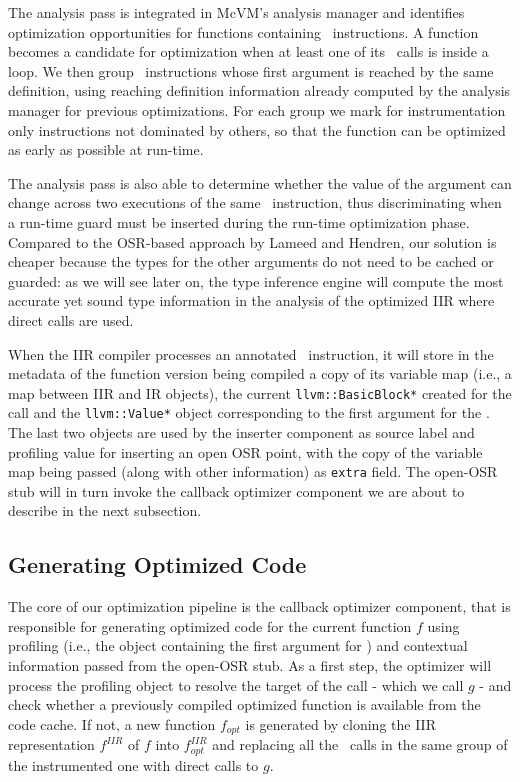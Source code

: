 The analysis pass is integrated in McVM's analysis manager and identifies optimization opportunities for functions containing \feval\ instructions. A function becomes a candidate for optimization when at least one of its \feval\ calls is inside a loop. We then group \feval\ instructions whose first argument is reached by the same definition, using reaching definition information already computed by the analysis manager for previous optimizations. For each group we mark for instrumentation only instructions not dominated by others, so that the function can be optimized as early as possible at run-time.

The analysis pass is also able to determine whether the value of the argument can change across two executions of the same \feval\ instruction, thus discriminating when a run-time guard must be inserted during the run-time optimization phase. Compared to the OSR-based approach by Lameed and Hendren, our solution is cheaper because the types for the other arguments do not need to be cached or guarded: as we will see later on, the type inference engine will compute the most accurate yet sound type information in the analysis of the optimized IIR where direct calls are used.

When the IIR compiler processes an annotated \feval\ instruction, it will store in the metadata of the function version being compiled a copy of its variable map (i.e., a map between IIR and IR objects), the current {\tt llvm::BasicBlock*} created for the call and the {\tt llvm::Value*} object corresponding to the first argument for the \feval. The last two objects are used by the inserter component as source label and profiling value for inserting an open OSR point, with the copy of the variable map being passed (along with other information) as {\tt extra} field. The open-OSR stub will in turn invoke the callback optimizer component we are about to describe in the next subsection.

\subsection{Generating Optimized Code}
The core of our optimization pipeline is the callback optimizer component, that is responsible for generating optimized code for the current function $f$ using profiling (i.e., the object containing the first argument for \feval) and contextual information passed from the open-OSR stub. As a first step, the optimizer will process the profiling object to resolve the target of the call - which we call $g$ -  and check whether a previously compiled optimized function is available from the code cache. If not, a new function $f_{opt}$ is generated by cloning the IIR representation $f^{IIR}$ of $f$ into
 $f^{IIR}_{opt}$ and replacing all the \feval\ calls in the same group of the instrumented one with direct calls to $g$.

